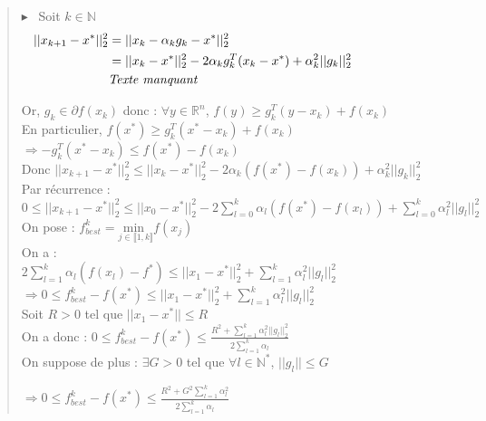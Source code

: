 \documentclass[12pt,a4paper]{article}
\newcommand{\preuve}[1]{%
    \begin{quote}
        $\blacktriangleright$~#1
    \end{quote}
}
\begin{document}
\preuve{
    Soit $k \in \mathbb{N}$
    \begin{align*}
        ||x_{k+1} - x^*||_2^2 &= ||x_k - \alpha_k g_k - x^*||_2^2 \hspace{14.5cm}\\
        &= ||x_k - x^*||_2^2 - 2 \alpha_k g_k^T (x_k - x^*) + \alpha_k^2 ||g_k||_2^2\\
        &\textit{Texte manquant}
    \end{align*}

    Or, $g_k \in \partial f(x_k)$ donc :
    $\forall y \in \mathbb{R}^n$, $f(y) \geq g_k^T(y - x_k) + f(x_k)$\\
    En particulier, $f(x^*) \geq g_k^T(x^* - x_k) + f(x_k)$\\
    $\Rightarrow -g_k^T(x^* - x_k) \leq f(x^*) - f(x_k)$\\

    Donc $||x_{k+1} - x^*||_2^2 \leq ||x_k - x^*||_2^2 - 2 \alpha_k (f(x^*) - f(x_k)) + \alpha_k^2 ||g_k||_2^2$\\

    Par récurrence :\\
    $0 \leq ||x_{k+1} - x^*||_2^2 \leq ||x_0 - x^*||_2^2 - 2 \sum_{l=0}^k \alpha_l (f(x^*) - f(x_l)) + \sum_{l=0}^k \alpha_l^2 ||g_l||_2^2$\\

    On pose : $f^k_{best} = \underset{j \in \llbracket 1, k \rrbracket}{\text{min }} f(x_j)$\\
    On a :\\
    $2 \sum_{l=1}^k\alpha_l (f(x_l) - f^*) \leq ||x_1 - x^*||_2^2 + \sum_{l=1}^k \alpha_l^2 ||g_l||_2^2$\\
    $\Rightarrow 0 \leq f^k_{best} - f(x^*) \leq ||x_1 - x^*||_2^2 + \sum_{l=1}^k \alpha_l^2 ||g_l||_2^2$\\
    
    Soit $R > 0$ tel que $||x_1 - x^*|| \leq R$\\

    On a donc : $0 \leq f^k_{best} - f(x^*) \leq \frac{R^2 + \sum_{l=1}^k \alpha_l^2 ||g_l||_2^2}{2 \sum_{l=1}^k \alpha_l}$\\


    On suppose de plus : $\exists G > 0$ tel que $\forall l \in \mathbb{N}^*$, $||g_l|| \leq G$\\

    \begin{tcolorbox}[colback=red!10!white,colframe=red!30!black]
        $\Rightarrow 0 \leq f^k_{best} - f(x^*) \leq \frac{R^2 + G^2 \sum_{l=1}^k \alpha_l^2}{2 \sum_{l=1}^k \alpha_l}$
    \end{tcolorbox}
}
\end{document}
